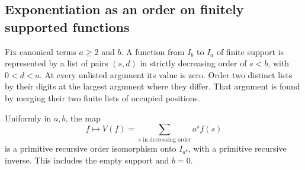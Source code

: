\subsection{Exponentiation as an order on finitely supported functions}
\label{sec:exporder}
Fix canonical terms $a\ge2$ and $b$. A function from $I_b$ to $I_a$
of finite support is represented by a list of pairs $(s,d)$ in strictly
decreasing order of $s<b$, with $0<d<a$. At every unlisted argument its
value is zero. Order two distinct lists by their digits at the largest
argument where they differ. That argument is found by merging their
two finite lists of occupied positions.

\begin{theorem}
Uniformly in $a,b$, the map
\[
                f\longmapsto V(f)=\sum_{s\text{ in decreasing order}}
                                      a^s f(s)
\]
is a primitive recursive order isomorphism onto $I_{a^b}$, with a
primitive recursive inverse. This includes the empty support and $b=0$.
\end{theorem}
